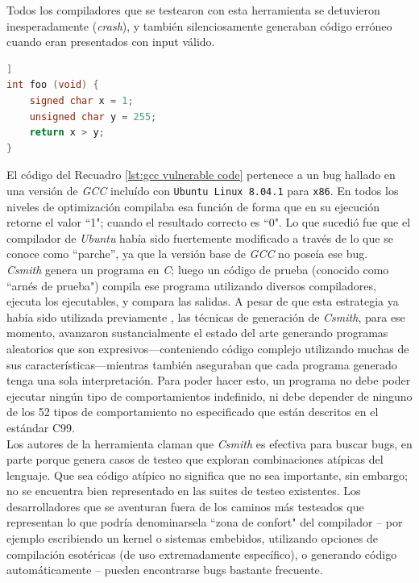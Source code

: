 Todos los compiladores que se testearon con esta herramienta se detuvieron inesperadamente (\textit{crash}), y también silenciosamente generaban código erróneo cuando eran presentados con input válido.\\

\begin{lstlisting}[language={c}, label={lst:gcc vulnerable code}, caption={Código que produjo bug en GCC}, captionpos={b}, frame={shadowbox}]]
int foo (void) {
    signed char x = 1;
    unsigned char y = 255;
    return x > y;
}
\end{lstlisting}

El código del Recuadro \ref{lst:gcc vulnerable code} pertenece a un bug hallado en una versión de \textit{GCC} incluído con \texttt{Ubuntu Linux 8.04.1} para \texttt{x86}. En todos los niveles de optimización compilaba esa función  de forma que en su ejecución retorne el valor ``1"; cuando el resultado correcto es ``0". Lo que sucedió fue que el compilador de \textit{Ubuntu} había sido fuertemente modificado a través de lo que se conoce como “parche”, ya que la versión base de \textit{GCC} no poseía ese bug\cite{Yang:2011:FUB:1993316.1993532}.\\

\textit{Csmith} genera un programa en \textit{C}; luego un código de prueba (conocido como ``arnés de prueba") compila ese programa utilizando diversos compiladores, ejecuta los ejecutables, y compara las salidas. A pesar de que esta estrategia ya había sido utilizada previamente \cite{Eide:2008:VM:1450058.1450093}\cite{McKeeman98differentialtesting}\cite{Sheridan2007c99comparison}, las técnicas de generación de \textit{Csmith}, para ese momento, avanzaron sustancialmente el estado del arte generando programas aleatorios que son expresivos—conteniendo código complejo utilizando muchas de sus características—mientras también aseguraban que cada programa generado tenga una sola interpretación. Para poder hacer esto, un programa no debe poder ejecutar ningún tipo de comportamientos indefinido, ni debe depender de ninguno de los 52 tipos de comportamiento no especificado que están descritos en el estándar C99\cite{openstdc99}.\\

Los autores de la herramienta claman que \textit{Csmith} es efectiva para buscar bugs, en parte porque genera casos de testeo que exploran combinaciones atípicas del lenguaje. Que sea código atípico no significa que no sea importante, sin embargo; no se encuentra bien representado en las suites de testeo existentes. Los desarrolladores que se aventuran fuera de los caminos más testeados que representan lo que podría denominarsela ``zona de confort" del compilador -- por ejemplo escribiendo un kernel o sistemas embebidos, utilizando opciones de compilación esotéricas (de uso extremadamente específico), o generando código automáticamente -- pueden encontrarse bugs bastante frecuente.\\

